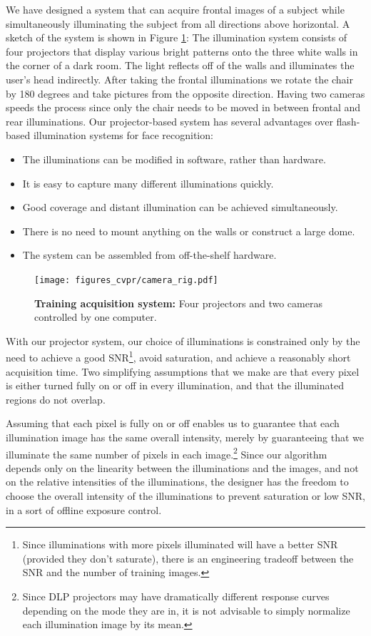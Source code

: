 \documentclass[10pt,journal,letterpaper,compsoc]{IEEEtran} %
\begin{document}
We have designed a system that can acquire frontal images of a subject while
simultaneously illuminating the subject from all directions above horizontal. A sketch of the
system is shown in Figure \ref{fig:system}: The illumination
system consists of four projectors that display various bright
patterns onto the three white walls in the corner of a dark
room.  The light reflects off of the walls and illuminates the
user's head indirectly.  After taking the frontal illuminations
we rotate the chair by 180 degrees and take pictures from the
opposite direction.  Having two cameras speeds the process
since only the chair needs to be moved in between frontal and
rear illuminations. Our projector-based system has several
advantages over flash-based illumination systems for face recognition:
\begin{itemize}
\item The illuminations can be modified in software, rather than hardware.
\item It is easy to capture many different illuminations quickly.
\item Good coverage and distant illumination can be achieved simultaneously.
\item There is no need to mount anything on the walls or construct a large dome.
\item The system can be assembled from off-the-shelf hardware.
\end{itemize}
\begin{figure}
\centering
\texttt{[image: figures\_cvpr/camera\_rig.pdf]}
\caption{{\bf Training acquisition system:} Four projectors and two cameras controlled by one computer.}
\vspace{-2em}
\label{fig:system}
\end{figure}
With our projector system, our choice of illuminations is
constrained only by the need to achieve a good
SNR\footnote{Since illuminations with more pixels illuminated
will have a better SNR (provided they don't saturate), there is
an engineering tradeoff between the SNR and the number of
training images.}, avoid saturation, and achieve
a reasonably short acquisition time.  Two simplifying
assumptions that we make are that every pixel is either turned
fully on or off in every illumination, and that the illuminated
regions do not overlap.

Assuming that each pixel is fully on or off enables us to guarantee
that each illumination image has the same overall intensity, merely
by guaranteeing that we illuminate the same number of pixels in each image.\footnote{Since DLP projectors may have dramatically different response
curves depending on the mode they are in, it is not advisable to simply normalize each illumination image by its mean.}
Since our algorithm depends only on  the
linearity between the illuminations and the images, and not on the
relative intensities of the illuminations, the designer has the freedom to choose the overall intensity of the illuminations
to prevent saturation or low SNR, in a sort of offline exposure control.
\end{document}
